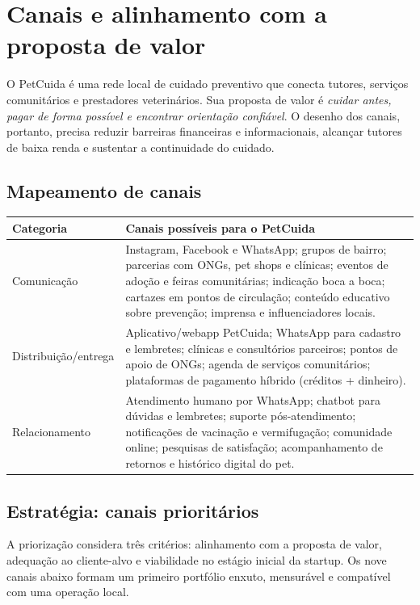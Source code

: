 \section{Canais e alinhamento com a proposta de valor}
\label{sec:canais}

O PetCuida é uma rede local de cuidado preventivo que conecta tutores, serviços comunitários e prestadores veterinários. Sua proposta de valor é \textit{cuidar antes, pagar de forma possível e encontrar orientação confiável}. O desenho dos canais, portanto, precisa reduzir barreiras financeiras e informacionais, alcançar tutores de baixa renda e sustentar a continuidade do cuidado.

\subsection{Mapeamento de canais}
\label{subsec:mapeamento}

\begin{longtable}{p{}p{}}
\toprule
\textbf{Categoria} & \textbf{Canais possíveis para o PetCuida}\\
\midrule
\endhead
Comunicação & Instagram, Facebook e WhatsApp; grupos de bairro; parcerias com ONGs, pet shops e clínicas; eventos de adoção e feiras comunitárias; indicação boca a boca; cartazes em pontos de circulação; conteúdo educativo sobre prevenção; imprensa e influenciadores locais.\\
\addlinespace
Distribuição/entrega & Aplicativo/webapp PetCuida; WhatsApp para cadastro e lembretes; clínicas e consultórios parceiros; pontos de apoio de ONGs; agenda de serviços comunitários; plataformas de pagamento híbrido (créditos + dinheiro).\\
\addlinespace
Relacionamento & Atendimento humano por WhatsApp; chatbot para dúvidas e lembretes; suporte pós-atendimento; notificações de vacinação e vermifugação; comunidade online; pesquisas de satisfação; acompanhamento de retornos e histórico digital do pet.\\
\bottomrule
\end{longtable}

\subsection{Estratégia: canais prioritários}
\label{subsec:estrategia}

A priorização considera três critérios: alinhamento com a proposta de valor, adequação ao cliente-alvo e viabilidade no estágio inicial da startup. Os nove canais abaixo formam um primeiro portfólio enxuto, mensurável e compatível com uma operação local.

